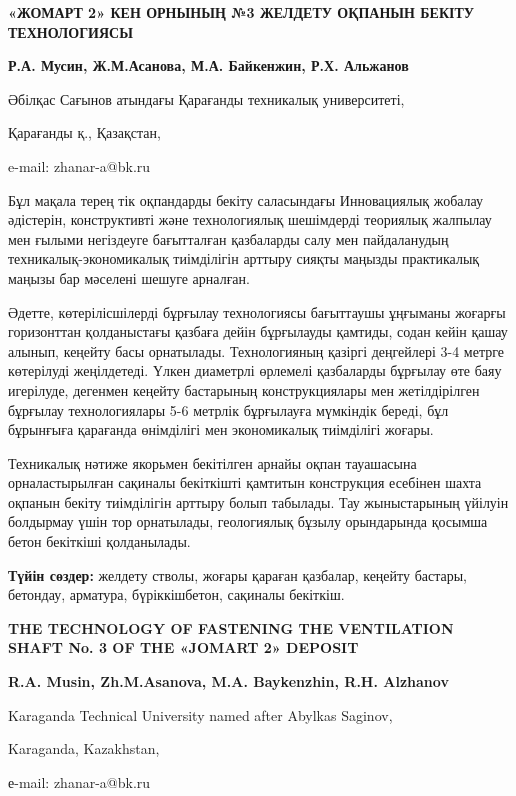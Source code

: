 \begin{center}
{\large\bfseries «ЖОМАРТ 2» КЕН ОРНЫНЫҢ №3 ЖЕЛДЕТУ ОҚПАНЫН БЕКІТУ ТЕХНОЛОГИЯСЫ}

{\bfseries Р.А. Мусин, Ж.М.Асанова\envelope, М.А. Байкенжин, Р.Х.
Альжанов}

Әбілқас Сағынов атындағы Қарағанды техникалық университеті,

Қарағанды қ., Қазақстан,

e-mail: zhanar-a@bk.ru
\end{center}

Бұл мақала терең тік оқпандарды бекіту саласындағы Инновациялық жобалау
әдістерін, конструктивті және технологиялық шешімдерді теориялық
жалпылау мен ғылыми негіздеуге бағытталған қазбаларды салу мен
пайдаланудың техникалық-экономикалық тиімділігін арттыру сияқты маңызды
практикалық маңызы бар мәселені шешуге арналған.

Әдетте, көтерілісшілерді бұрғылау технологиясы бағыттаушы ұңғыманы
жоғарғы горизонттан қолданыстағы қазбаға дейін бұрғылауды қамтиды, содан
кейін қашау алынып, кеңейту басы орнатылады. Технологияның қазіргі
деңгейлері 3-4 метрге көтерілуді жеңілдетеді. Үлкен диаметрлі өрлемелі
қазбаларды бұрғылау өте баяу игерілуде, дегенмен кеңейту бастарының
конструкциялары мен жетілдірілген бұрғылау технологиялары 5-6 метрлік
бұрғылауға мүмкіндік береді, бұл бұрынғыға қарағанда өнімділігі мен
экономикалық тиімділігі жоғары.

Техникалық нәтиже якорьмен бекітілген арнайы оқпан тауашасына
орналастырылған сақиналы бекіткішті қамтитын конструкция есебінен шахта
оқпанын бекіту тиімділігін арттыру болып табылады. Тау жыныстарының
үйілуін болдырмау үшін тор орнатылады, геологиялық бұзылу орындарында
қосымша бетон бекіткіші қолданылады.

{\bfseries Түйін сөздер:} желдету стволы, жоғары қараған қазбалар, кеңейту
бастары, бетондау, арматура, бүріккішбетон, сақиналы бекіткіш.

\begin{center}
{\large\bfseries THE TECHNOLOGY OF FASTENING THE VENTILATION SHAFT No. 3 OF THE «JOMART 2» DEPOSIT}

{\bfseries R.A. Musin, Zh.M.Asanova\envelope, M.A. Baykenzhin,
R.H. Alzhanov}

Karaganda Technical University named after Abylkas Saginov,

Karaganda, Kazakhstan,

е-mail: zhanar-a@bk.ru
\end{center}

